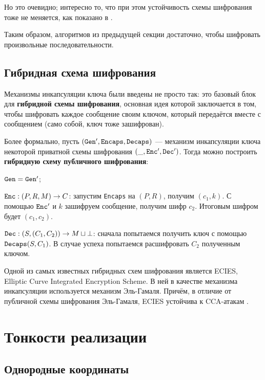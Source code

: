 \documentclass[a4paper,14pt]{extarticle}
\begin{document}
Но это очевидно; интересно то, что при этом устойчивость схемы шифрования тоже
не меняется, как показано в \cite{textbook}.

Таким образом, алгоритмов из предыдущей секции достаточно, чтобы шифровать
произвольные последовательности.

\newpage

\subsection{Гибридная схема шифрования}
\label{hybrid}

Механизмы инкапсуляции ключа были введены не просто так: это базовый блок для
\textbf{гибридной схемы шифрования}, основная идея которой заключается в том,
чтобы шифровать каждое сообщение своим ключом, который передаётся вместе с
сообщением (само собой, ключ тоже зашифрован).

Более формально, пусть $(\verb|Gen|', \verb|Encaps|, \verb|Decaps|)$ ---
механизм инкапсуляции ключа некоторой приватной схемы шифрования
$(\_, \verb|Enc|', \verb|Dec|')$. Тогда можно построить
\textbf{гибридную схему публичного шифрования}:

\vspace{0.2cm}

$\verb|Gen| = \verb|Gen|'$;

$\verb|Enc|: (P, R, M) \to C$: запустим \verb|Encaps| на $(P, R)$,
получим $(c_1, k)$. С помощью $\verb|Enc|'$ и $k$ зашифруем сообщение,
получим шифр $c_2$. Итоговым шифром будет $(c_1, c_2)$.

$\verb|Dec|: (S, (C_1, C_2)) \to M \sqcup \bot$: сначала попытаемся
получить ключ с помощью $\verb|Decaps|(S, C_1)$. В случае успеха
попытаемся расшифровать $C_2$ полученным ключом.

\vspace{0.2cm}

Одной из самых известных гибридных схем шифрования является ECIES, Elliptic
Curve Integrated Encryption Scheme. В ней в качестве механизма инкапсуляции
используется механизм Эль-Гамаля. Причём, в отличие от публичной схемы
шифрования Эль-Гамаля, ECIES устойчива к CCA-атакам \cite{textbook}.

\newpage

\section{Тонкости реализации}

\subsection{Однородные координаты}
\end{document}
